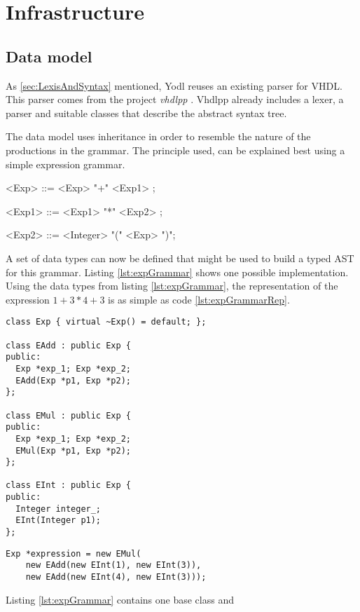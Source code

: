 \section{Infrastructure}
\label{sec:Infrastructure}

\subsection{Data model}
\label{sec:DataModel}

As \ref{sec:LexisAndSyntax} mentioned, Yodl reuses an existing parser
for VHDL. This parser comes from the project \emph{vhdlpp} \cite{VHDLPP}.
Vhdlpp already includes a lexer, a parser and suitable classes that
describe the abstract syntax tree.

The data model uses inheritance in order to resemble the nature of the
productions in the grammar. The principle used, can be explained best
using a simple expression grammar.
%
\begin{grammar}
<Exp>  ::= <Exp>  "+" <Exp1> ;

<Exp1> ::= <Exp1> "*" <Exp2> ;

<Exp2> ::= <Integer> \alt "(" <Exp> ")";
\end{grammar}
%
A set of data types can now be defined that might be used to build a
typed AST for this grammar. Listing \ref{lst:expGrammar} shows one
possible implementation. Using the data types from listing
\ref{lst:expGrammar}, the representation of the expression \(1+3*4+3\)
is as simple as code \ref{lst:expGrammarRep}.
%
\begin{lstlisting}[style=c++, caption={Class hierarchy for a simple
      expression grammar}, label={lst:expGrammar}]
class Exp { virtual ~Exp() = default; };

class EAdd : public Exp {
public:
  Exp *exp_1; Exp *exp_2;
  EAdd(Exp *p1, Exp *p2);
};

class EMul : public Exp {
public:
  Exp *exp_1; Exp *exp_2;
  EMul(Exp *p1, Exp *p2);
};

class EInt : public Exp {
public:
  Integer integer_;
  EInt(Integer p1);
};
\end{lstlisting}
%
\begin{lstlisting}[style=c++, caption={Representation of \((1+3)*(4+3)\)},
    label={lst:expGrammarRep}]
Exp *expression = new EMul(
    new EAdd(new EInt(1), new EInt(3)),
    new EAdd(new EInt(4), new EInt(3)));
\end{lstlisting}
%
Listing \ref{lst:expGrammar} contains one base class  and
